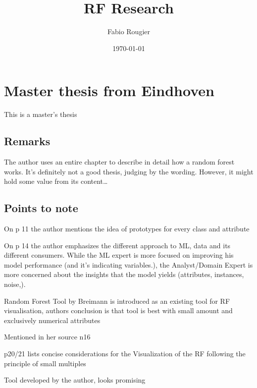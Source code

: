 \documentclass[a4paper, 12pt]{article}
\title{RF Research}
\author{Fabio Rougier}
\date{\today}
\begin{document}
\maketitle

\tableofcontents

\section{Master thesis from Eindhoven}
This  is a master's thesis

\subsection{Remarks}
The author uses an entire chapter to describe in detail how a random forest works. 
It's definitely not a good thesis, judging by the wording. However, it might hold some value from its content\dots

\subsection{Points to note}
\begin{description}[font=$\bullet$~\normalfont]
    \item [Prototypes:]On p 11 the author mentions the idea of prototypes for every class and attribute
    \item [Different consumers: ]On p 14 the author emphasizes the different approach to ML, data and its 
        different consumers.
        While the ML expert is more focused on improving his model performance (and it's indicating variables.),
        the Analyst/Domain Expert is more concerned about the insights that the model yields (attributes, instances,
        noise,).
    \item [RAFT:]Random Forest Tool by Breimann is introduced as an existing tool for RF visualisation, authors
            conclusion is that tool is best with small amount and exclusively numerical attributes 
    \item [Small multiples:]Mentioned in her source n16 \cite{tufte1985visual}
    \item [Visualization considerations:] p20/21 lists concise considerations for the Visualization of the RF
            following the principle of small multiples
    \item [ReFINE:]Tool developed by the author, looks promising
\end{description}
\end{document}
